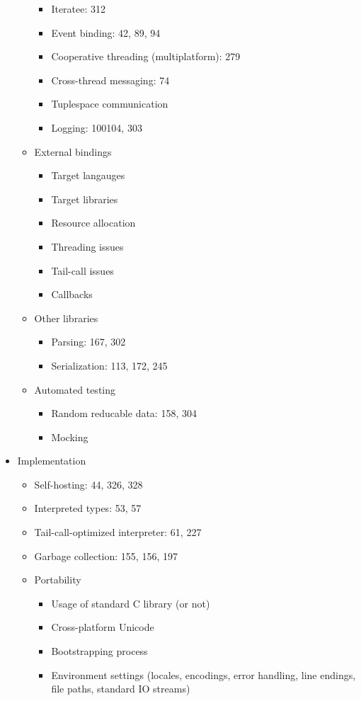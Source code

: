 \begin{itemize}
\begin{itemize}
\begin{itemize}
    \item Iteratee: 312
    \item Event binding: 42, 89, 94
    \item Cooperative threading (multiplatform): 279
    \item Cross-thread messaging: 74
    \item Tuplespace communication
    \item Logging: 100104, 303
    \end{itemize}
  \item External bindings
    \begin{itemize}
    \item Target langauges
    \item Target libraries
    \item Resource allocation
    \item Threading issues
    \item Tail-call issues
    \item Callbacks
    \end{itemize}
  \item Other libraries
    \begin{itemize}
    \item Parsing: 167, 302
    \item Serialization: 113, 172, 245
    \end{itemize}
  \item Automated testing
    \begin{itemize}
    \item Random reducable data: 158, 304
    \item Mocking
    \end{itemize}
  \end{itemize}
\item Implementation
  \begin{itemize}
  \item Self-hosting: 44, 326, 328
  \item Interpreted types: 53, 57
  \item Tail-call-optimized interpreter: 61, 227
  \item Garbage collection: 155, 156, 197
  \item Portability
    \begin{itemize}
    \item Usage of standard C library (or not)
    \item Cross-platform Unicode
    \item Bootstrapping process
    \item Environment settings (locales, encodings, error handling, line endings, file paths, standard IO streams)

\end{itemize}
\end{itemize}
\end{itemize}
